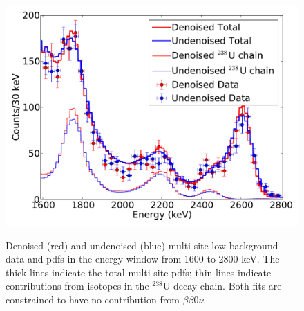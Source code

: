 \begin{figure}
\begin{center}
\includegraphics[keepaspectratio=true,width=\textwidth]{DenoisedVsUndenoised_TotalPdfsWithData_rnrange_MS.pdf}
\end{center}
\renewcommand{\baselinestretch}{1}
\small\normalsize
\begin{quote}
\caption{Denoised (red) and undenoised (blue) multi-site low-background data and pdfs in the energy window from 1600 to 2800 keV.  The thick lines indicate the total multi-site pdfs; thin lines indicate contributions from isotopes in the $^{238}$U decay chain.  Both fits are constrained to have no contribution from $\beta\beta 0\nu$.}
\label{fig:DenoisedComparison_rnMS}
\end{quote}
\end{figure}
\renewcommand{\baselinestretch}{2}
\small\normalsize

